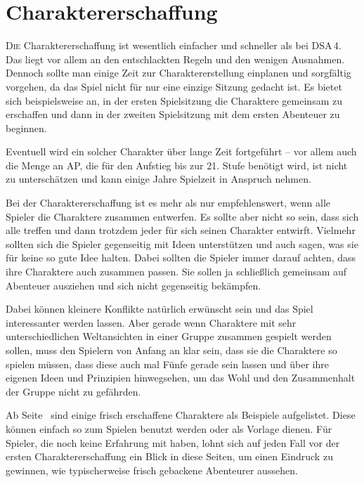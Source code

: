 \chapter{Charaktererschaffung}\label{Ch:Charaktererschaffung}
\lettrine{D}{ie} Charaktererschaffung ist wesentlich einfacher und schneller als bei DSA\,4. Das liegt vor allem an den entschlackten Regeln und den wenigen Ausnahmen. Dennoch sollte man einige Zeit zur Charaktererstellung einplanen und sorgfältig vorgehen, da das Spiel nicht für nur eine einzige Sitzung gedacht ist. Es bietet sich beispielsweise an, in der ersten Spielsitzung die Charaktere gemeinsam zu erschaffen und dann in der zweiten Spielsitzung mit dem ersten Abenteuer zu beginnen.

Eventuell wird ein solcher Charakter über lange Zeit fortgeführt -- vor allem auch die Menge an AP, die für den Aufstieg bis zur 21. Stufe benötigt wird, ist nicht zu unterschätzen und kann einige Jahre Spielzeit in Anspruch nehmen.

Bei der Charaktererschaffung ist es mehr als nur empfehlenswert, wenn alle Spieler die Charaktere zusammen entwerfen. Es sollte aber nicht so sein, dass sich alle treffen und dann trotzdem jeder für sich seinen Charakter entwirft. Vielmehr sollten sich die Spieler gegenseitig mit Ideen unterstützen und auch sagen, was sie für keine so gute Idee halten. Dabei sollten die Spieler immer darauf achten, dass ihre Charaktere auch zusammen passen. Sie sollen ja schließlich gemeinsam auf Abenteuer ausziehen und sich nicht gegenseitig bekämpfen.

Dabei können kleinere Konflikte natürlich erwünscht sein und das Spiel interessanter werden lassen. Aber gerade wenn Charaktere mit sehr unterschiedlichen Weltansichten in einer Gruppe zusammen gespielt werden sollen, muss den Spielern von Anfang an klar sein, dass sie die Charaktere so spielen müssen, dass diese auch mal Fünfe gerade sein lassen und über ihre eigenen Ideen und Prinzipien hinwegsehen, um das Wohl und den Zusammenhalt der Gruppe nicht zu gefährden.

Ab Seite~\pageref{Ch:Beispielcharaktere} sind einige frisch erschaffene Charaktere als Beispiele aufgelistet. Diese können einfach so zum Spielen benutzt werden oder als Vorlage dienen. Für Spieler, die noch keine Erfahrung mit \StoryDSA haben, lohnt sich auf jeden Fall vor der ersten Charaktererschaffung ein Blick in diese Seiten, um einen Eindruck zu gewinnen, wie typischerweise frisch gebackene Abenteurer aussehen.

